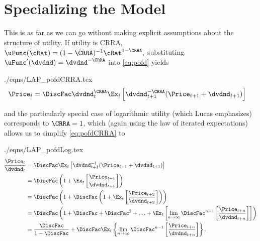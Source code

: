 \documentclass{handout}
\begin{document}
\section{Specializing the Model}

This is as far as we can go without making explicit assumptions about the structure
of utility.  If utility is CRRA, $\uFunc(\cRat)=(1-\CRRA)^{-1}\cRat^{1-\CRRA},$ substituting $\uFunc^{\prime}(\dvdnd)=\dvdnd^{-\CRRA}$ into \eqref{eq:pofd} yields
\begin{verbatimwrite}{./eqns/LAP_pofdCRRA.tex}
\begin{equation}\begin{gathered}\begin{aligned}
 \Price_{t} & =  \DiscFac \dvdnd_{t}^{\CRRA} \Ex_{t}\left[\dvdnd_{t+1}^{-\CRRA}(\Price_{t+1}+\dvdnd_{t+1})\right] \label{eq:pofdCRRA}
\end{aligned}\end{gathered}\end{equation}
\end{verbatimwrite}

and the particularly special case of logarithmic utility (which Lucas emphasizes) corresponds to $\CRRA=1$, which (again using the law of iterated expectations) allows us to simplify \eqref{eq:pofdCRRA} to
\begin{verbatimwrite}{./eqns/LAP_pofdLog.tex}
\begin{equation*}\begin{gathered}\begin{aligned}
\frac{\Price_{t}}{\dvdnd_{t}} & =  \DiscFac \Ex_{t}\left[\dvdnd_{t+1}^{-1}(\Price_{t+1}+\dvdnd_{t+1})\right] \label{eq:pofdLog}
\\ & =  \DiscFac \left(1+\Ex_{t} \left[\frac{{\Price}_{t+1}}{\dvdnd_{t+1}}\right]\right)
\\ & =  \DiscFac \left(1+\DiscFac \left(1+\Ex_{t}\left[\frac{{\Price}_{t+2}}{\dvdnd_{t+2}}\right]\right)\right)
\\ & =  \DiscFac \left(1 + \DiscFac + \DiscFac^{2} + \ldots + \Ex_{t} \left[\lim_{n\rightarrow \infty}\DiscFac^{n-1}\left[\frac{\Price_{t+n}}{\dvdnd_{t+n}}\right]\right]\right)
\\ & =  \frac{\DiscFac}{1-\DiscFac} + \DiscFac \Ex_{t}\left\{\lim_{n\rightarrow \infty}\DiscFac^{n-1}\left[\frac{\Price_{t+n}}{\dvdnd_{t+n}}\right]\right\}.
\end{aligned}\end{gathered}\end{equation*}
\end{verbatimwrite}

\end{document}
